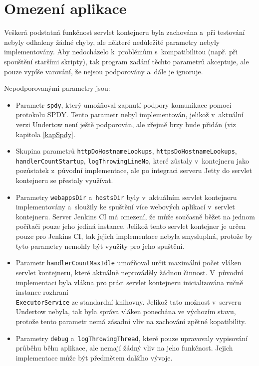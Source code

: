         
    \section{Omezení aplikace}
        Veškerá podstatná funkčnost servlet kontejneru byla zachována a~při testování nebyly odhaleny žádné chyby,
        ale některé nedůležité parametry nebyly implementovány. Aby nedocházelo
        k~problémům s~kompatibilitou (např. při spouštění staršími skripty), tak program zadání těchto
        parametrů akceptuje, ale pouze vypíše varování, že nejsou podporovány a~dále je ignoruje.
        
        \medskip
        \noindent Nepodporovanými parametry jsou:
        \begin{itemize}
            \item Parametr \texttt{spdy}, který umožňoval zapnutí podpory komunikace pomocí protokolu SPDY. Tento parametr
                nebyl implementován, jelikož v~aktuální verzi Undertow není ještě podporován, ale zřejmě
                brzy bude přidán (viz kapitola \ref{kapSpdy}.

            \item Skupina parametrů \texttt{httpDoHostnameLookups}, \texttt{httpsDoHostnameLookups}, \\\texttt{handlerCountStartup},
                \texttt{logThrowingLineNo}, které zůstaly v~kontejneru jako pozůstatek z~původní implementace, ale po integraci
                serveru Jetty do servlet kontejneru se přestaly využívat.

            \item Parametry \texttt{webappsDir} a~\texttt{hostsDir} byly v~aktuálním servlet kontejneru implementovány
                a~sloužily ke spuštění více webových aplikací v~servlet kontejneru. Server Jenkins CI má omezení,
                že může současně běžet na jednom počítači pouze jeho jediná instance. 
                Jelikož tento servlet kontejner je určen pouze pro Jenkins CI, tak jejich implementace nebyla smysluplná,
                protože by tyto parametry nemohly být využity pro jeho spuštění.

            \item Parametr \texttt{handlerCountMaxIdle} umožňoval určit maximální počet vláken servlet kontejneru, 
                které aktuálně neprováděly žádnou činnost. V~původní implementaci byla vlákna pro práci servlet kontejneru
                inicializována ručně instance rozhraní \\\texttt{ExecutorService} ze standardní knihovny. Jelikož
                tato možnost v~serveru Undertow nebyla, tak byla správa vláken ponechána ve výchozím stavu,
                protože tento parametr nemá zásadní vliv na zachování zpětné kopatibility.

            \item Parametry \texttt{debug} a~\texttt{logThrowingThread}, které pouze upravovaly vypisování průběhu
                běhu aplikace, ale nemají žádný vliv na jeho funkčnost. Jejich implementace může být předmětem dalšího
                vývoje.
        \end{itemize}
        
